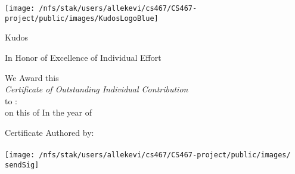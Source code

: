 \documentclass[landscape, 14pt]{article}
\begin{document}
\centering
\begin{minipage}{.9\textwidth}
\centering
\texttt{[image: /nfs/stak/users/allekevi/cs467/CS467-project/public/images/KudosLogoBlue]}
\end{minipage}

\Huge Kudos\\
\vspace{1cm}

\Huge In Honor of Excellence of Individual Effort\par
\smallskip
{\Large We Award this\\}
\smallskip
\textit{\huge Certificate of Outstanding Individual Contribution\\}
\smallskip
{\Large to : \recvVar\\}
\smallskip
{\large on this \dayVar of \monVar In the year of \yearVar\\}
\vspace{1.5cm}
\begin{minipage}[t]{0.5\textwidth}
\centering
{\large Certificate Authored by:\\}
{\large \sendVar\\}
\texttt{[image: /nfs/stak/users/allekevi/cs467/CS467-project/public/images/\\sendSig]}
\end{minipage}
\end{document}
